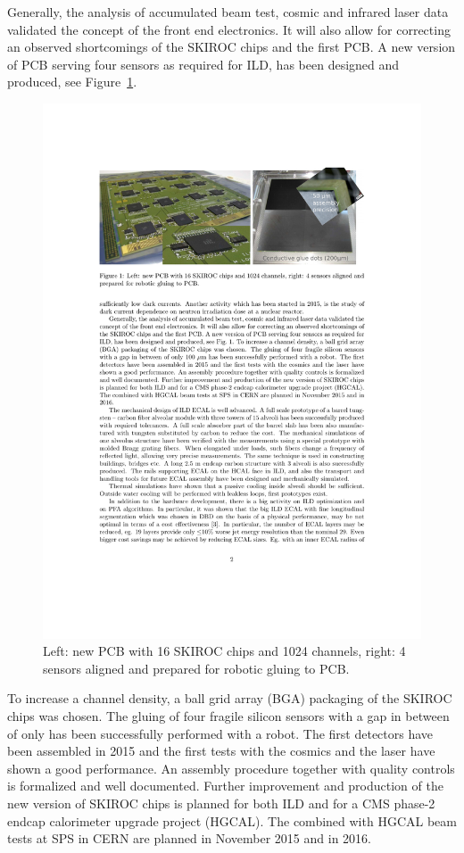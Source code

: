 Generally, the analysis of accumulated beam test, cosmic and infrared laser
data validated the concept of the front end electronics. It will also allow
for correcting an observed shortcomings of the SKIROC chips and the first
PCB. A new version of PCB serving four sensors as required for ILD, has been
designed and produced, see Figure~\ref{ild_siw_ecal_fev}.
\begin{figure}
\centering
\includegraphics[width=\textwidth]{Calorimeter/SiliconTungstenILD/FEV_gluing_photo.pdf}
\caption{Left: new PCB with 16 SKIROC chips and 1024 channels, right: 4 sensors
 aligned and prepared for robotic gluing to PCB.}
\label{ild_siw_ecal_fev}
\end{figure}
To increase a channel density, a ball grid array
(BGA) packaging of the SKIROC chips was chosen. The gluing of four fragile silicon
sensors with a gap in between of only \unit[100]{\micron} has been successfully
performed with a robot. The first detectors have been assembled in 2015 and
the first tests with the cosmics and the laser have shown a good performance. An assembly
procedure together with quality controls is formalized and well documented.
Further improvement and production of the new version of SKIROC chips is planned
for both ILD and for a CMS phase-2 endcap calorimeter upgrade project
(HGCAL). The combined with HGCAL beam tests at SPS in CERN are planned in
November 2015 and in 2016.


